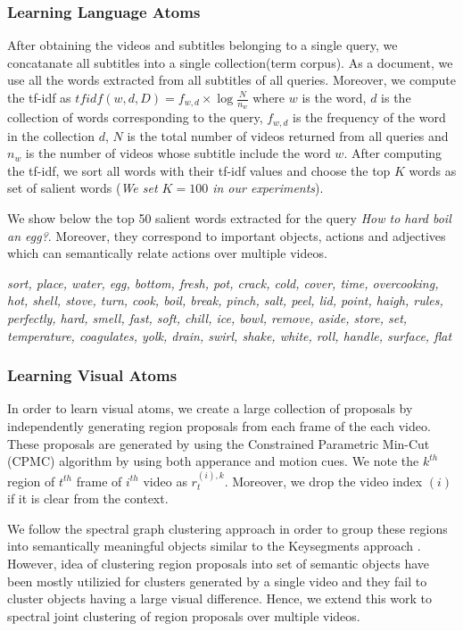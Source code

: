 \subsubsection{Learning Language Atoms}
After obtaining the videos and subtitles belonging to a single query, we concatanate all subtitles into a single collection(term corpus). As a document, we use all the words extracted from all subtitles of all queries. Moreover, we compute the tf-idf as $tfidf(w,d,D)=f_{w,d} \times \log \frac{N}{n_{w}}$ where $w$ is the word, $d$ is the collection of words corresponding to the query, $f_{w,d}$ is the frequency of the word in the collection $d$, $N$ is the total number of videos returned from all queries and $n_{w}$ is the number of videos whose subtitle include the word $w$. After computing the tf-idf, we sort all words with their tf-idf values and choose the top $K$ words as set of salient words (\emph{We set $K=100$ in our experiments}).

We show below the top 50 salient words extracted for the query \emph{How to hard boil an egg?}. Moreover, they correspond to important objects, actions and adjectives which can semantically relate actions over multiple videos.

\footnotesize
\emph{sort, place, water, egg, bottom, fresh, pot, crack, cold, cover, time, overcooking, hot, shell, stove, turn, cook, boil, break, pinch, salt, peel, lid, point, haigh, rules, perfectly, hard, smell, fast, soft, chill, ice, bowl, remove, aside, store, set, temperature, coagulates, yolk, drain, swirl, shake, white, roll, handle, surface, flat}
\normalsize


\subsubsection{Learning Visual Atoms}
In order to learn visual atoms, we create a large collection of proposals by independently generating region proposals from each frame of the each video. These proposals are generated by using the Constrained Parametric Min-Cut (CPMC) \cite{cpmc} algorithm by using both apperance and motion cues. We note the $k^{th}$ region of $t^{th}$ frame of $i^{th}$ video as $r^{(i),k}_t$. Moreover, we drop the video index $(i)$ if it is clear from the context.

We follow the spectral graph clustering approach in order to group these regions into semantically meaningful objects similar to the Keysegments approach \cite{keysegments}. However, idea of clustering region proposals into set of semantic objects have been mostly utilizied for clusters generated by a single video and they fail to cluster objects having a large visual difference. Hence, we extend this work to spectral joint clustering of region proposals over multiple videos.

